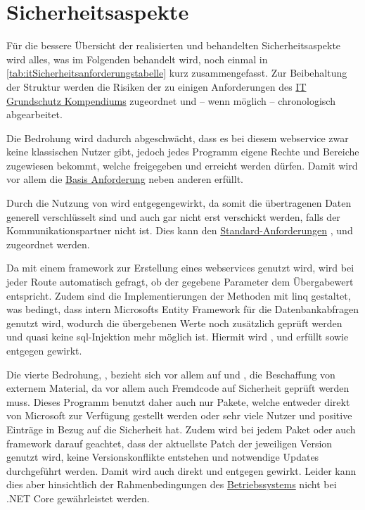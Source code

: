 \section{Sicherheitsaspekte}\label{sec:sicherheitsaspekte}

	Für die bessere Übersicht der realisierten und behandelten Sicherheitsaspekte wird alles,
	was im Folgenden behandelt wird,
	noch einmal in \vref{tab:itSicherheitsanforderungstabelle} kurz zusammengefasst.
	Zur Beibehaltung der Struktur werden die Risiken der 
	zu einigen Anforderungen des \hyperref[sec:it-grundschutz-kompendium]{IT Grundschutz Kompendiums}
	zugeordnet und -- wenn möglich -- chronologisch abgearbeitet.

	Die Bedrohung  wird dadurch abgeschwächt,
	dass es bei diesem \gls{webservice} zwar keine klassischen Nutzer gibt,
	jedoch jedes  Programm eigene Rechte
	und Bereiche zugewiesen bekommt,
	welche freigegeben und erreicht werden dürfen.
	Damit wird vor allem die \hyperref[par:APP.3.1]{Basis Anforderung}
	 neben anderen erfüllt.

	Durch die Nutzung von  wird  entgegengewirkt,
	da somit die übertragenen Daten generell verschlüsselt sind
	und auch gar nicht erst verschickt werden,
	falls der Kommunikationspartner nicht  ist.
	Dies kann den \hyperref[par:APP.3.2]{Standard-Anforderungen}
	, 
	und 
	zugeordnet werden.

	Da  mit einem \gls{framework} zur Erstellung eines \glspl{webservice} genutzt wird,
	wird bei jeder Route automatisch gefragt,
	ob der gegebene Parameter dem Übergabewert entspricht.
	Zudem sind die Implementierungen der Methoden mit \gls{linq} gestaltet,
	was bedingt,
	dass intern Microsofts Entity Framework für die Datenbankabfragen genutzt wird,
	wodurch die übergebenen Werte noch zusätzlich geprüft werden
	und quasi keine \gls{sql}-Injektion mehr möglich ist.
	Hiermit wird ,
	und  erfüllt
	sowie  entgegen gewirkt.

	Die vierte Bedrohung, ,
	bezieht sich vor allem auf  und ,
	die Beschaffung von externem Material,
	da vor allem auch Fremdcode auf Sicherheit geprüft werden muss.
	Dieses Programm benutzt daher auch nur Pakete,
	welche entweder direkt von Microsoft zur Verfügung gestellt werden oder sehr viele Nutzer
	und positive Einträge in Bezug auf die Sicherheit hat.
	Zudem wird bei jedem Paket oder auch \gls{framework} darauf geachtet,
	dass der aktuellste Patch der jeweiligen Version genutzt wird,
	keine Versionskonflikte entstehen
	und notwendige Updates durchgeführt werden.
	Damit wird auch direkt
	und  entgegen gewirkt.
	Leider kann dies aber hinsichtlich der Rahmenbedingungen des \hyperref[subsec:betriebssystem]{Betriebssystems}
	nicht bei .NET Core gewährleistet werden.

